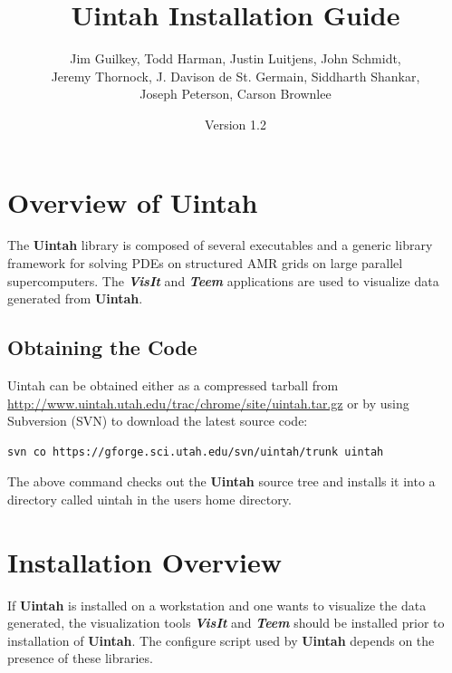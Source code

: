 \documentclass[12pt]{article}
\begin{document}
\title{Uintah Installation Guide}

\author{Jim Guilkey, Todd Harman, Justin Luitjens, John Schmidt,
  \\ Jeremy Thornock,
  J. Davison de St. Germain, Siddharth Shankar, \\
  Joseph Peterson,  
  Carson Brownlee}

\date{Version 1.2}

\maketitle



\newpage

\tableofcontents

\newpage

\section{Overview of Uintah} \label{sec:overview}

The \textbf{Uintah} library is composed of several executables and a
generic library framework for solving PDEs on structured AMR grids on
large parallel supercomputers. The \textbf{\emph{VisIt}} and
\textbf{\emph{Teem}} applications are used to visualize data generated
from \textbf{Uintah}.

\subsection{Obtaining the Code}
Uintah can be obtained either as a compressed tarball from
\url{http://www.uintah.utah.edu/trac/chrome/site/uintah.tar.gz} or by using
Subversion (SVN) to download the latest source code:

\begin{verbatim}
svn co https://gforge.sci.utah.edu/svn/uintah/trunk uintah
\end{verbatim}

The above command checks out the \textbf{Uintah} source tree and
installs it into a directory called uintah in the users home
directory.


\section{Installation Overview}

If \textbf{Uintah} is installed on a workstation and one wants to
visualize the data generated, the visualization tools
\textbf{\emph{VisIt}} and \textbf{\emph{Teem}} should be installed
prior to installation of \textbf{Uintah}.  The configure script used by
\textbf{Uintah} depends on the presence of these libraries.
\end{document}
